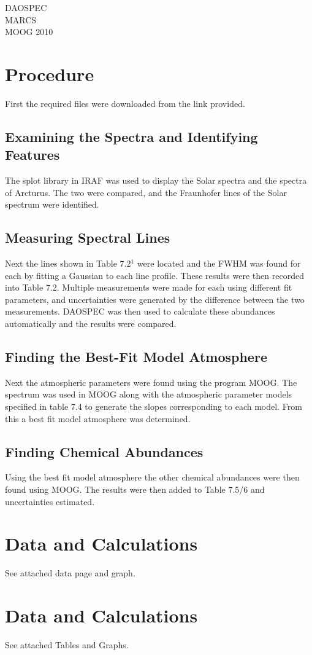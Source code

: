 \documentclass{article}
\begin{document}
DAOSPEC\\
MARCS\\
MOOG 2010\\
\section{Procedure}
First the required files were downloaded from the link provided.
\subsection{Examining the Spectra and Identifying Features}
The splot library in IRAF was used to display the Solar spectra and the spectra of Arcturus. The two were compared, and the Fraunhofer lines of the Solar spectrum were identified.
\subsection{Measuring Spectral Lines}
Next the lines shown in Table 7.2$^1$ were located and the FWHM was found for each by fitting a Gaussian to each line profile. These results were then recorded into Table 7.2. Multiple measurements were made for each using different fit parameters, and uncertainties were generated by the difference between the two measurements. DAOSPEC was then used to calculate these abundances automatically and the results were compared.
\subsection{Finding the Best-Fit Model Atmosphere}
Next the atmospheric parameters were found using the program MOOG. The spectrum was used in MOOG along with the atmospheric parameter models specified in table 7.4 to generate the slopes corresponding to each model. From this a best fit model atmosphere was determined.
\subsection{Finding Chemical Abundances}
Using the best fit model atmosphere the other chemical abundances were then found using MOOG. The results were then added to Table 7.5/6 and uncertainties estimated. 
\section{Data and Calculations}
See attached data page and graph.
\section{Data and Calculations}
See attached Tables and Graphs.
\end{document}
